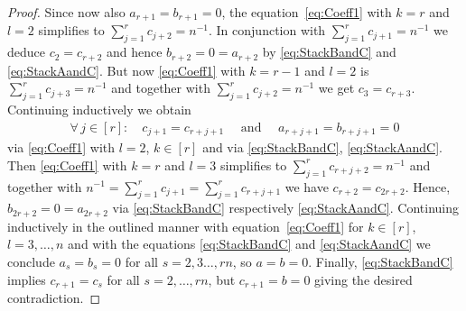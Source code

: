 \begin{proof}
Since now also $a_{r + 1} = b_{r +1} = 0$, the equation~\eqref{eq:Coeff1} with $k=r$ and $l=2$ simplifies to $\sum_{j=1}^r c_{j+2} = n^{-1}$. In conjunction with $\sum_{j=1}^{r} c_{j+1} = n^{-1}$ we deduce $c_2 = c_{r+2}$ and hence $b_{r+2} = 0 = a_{r +2} $ by \eqref{eq:StackBandC} and \eqref{eq:StackAandC}. But now \eqref{eq:Coeff1} with $k=r-1$ and $l=2$ is $\sum_{j=1}^r c_{j+3} = n^{-1}$ and together with $\sum_{j=1}^r c_{j+2} = n^{-1}$ we get $c_3 = c_{r+3}$. Continuing inductively we obtain 
	\begin{align*}
	\forall \, j \in [r] \colon \quad c_{j+1} = c_{r + j + 1} \quad \text{ and } \quad a_{r + j +1} = b_{r + j + 1} = 0
	\end{align*}
via \eqref{eq:Coeff1} with $l=2$, $k \in [r]$ and via \eqref{eq:StackBandC}, \eqref{eq:StackAandC}. Then \eqref{eq:Coeff1} with $k=r$ and $l=3$ simplifies to $\sum_{j=1}^r c_{r + j+2} = n^{-1}$ and together with $n^{-1} = \sum_{j=1}^{r} c_{j+1} =  \sum_{j=1}^{r} c_{r + j +1}$ we have $c_{r + 2} = c_{2r + 2}$. Hence, $b_{2 r+2} = 0 = a_{2 r + 2}$ via \eqref{eq:StackBandC} respectively \eqref{eq:StackAandC}. Continuing inductively in the outlined manner with equation~\eqref{eq:Coeff1} for $k \in [r]$, $l=3,\ldots,n$ and with the equations \eqref{eq:StackBandC} and \eqref{eq:StackAandC} we conclude $a_s = b_s = 0$ for all $s=2,3 \ldots, r n$, so $a=b=0$. Finally, \eqref{eq:StackBandC} implies $c_{r + 1} = c_s$ for all $s = 2,\ldots, r n$, but $c_{r + 1} = b = 0$ giving the desired contradiction.
\end{proof}




























































